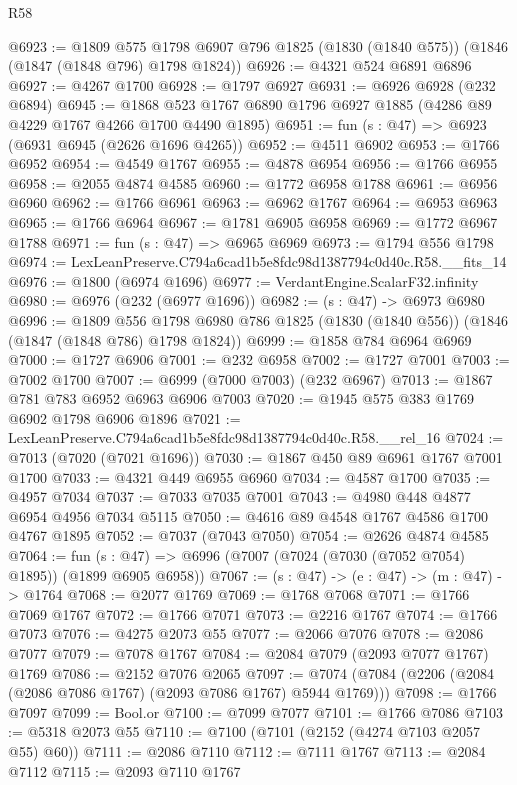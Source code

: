 \begin{lexlean}{R58}
\begin{coremodule}
@6923 := @1809
    @575
    @1798
    @6907
    @796
    @1825
    (@1830 (@1840 @575))
    (@1846 (@1847 (@1848 @796) @1798 @1824))
@6926 := @4321 @524 @6891 @6896
@6927 := @4267 @1700
@6928 := @1797 @6927
@6931 := @6926 @6928 (@232 @6894)
@6945 := @1868 @523 @1767 @6890 @1796 @6927 @1885 (@4286 @89 @4229 @1767 @4266 @1700 @4490 @1895)
@6951 := fun (s : @47) => @6923 (@6931 @6945 (@2626 @1696 @4265))
@6952 := @4511 @6902
@6953 := @1766 @6952
@6954 := @4549 @1767
@6955 := @4878 @6954
@6956 := @1766 @6955
@6958 := @2055 @4874 @4585
@6960 := @1772 @6958 @1788
@6961 := @6956 @6960
@6962 := @1766 @6961
@6963 := @6962 @1767
@6964 := @6953 @6963
@6965 := @1766 @6964
@6967 := @1781 @6905 @6958
@6969 := @1772 @6967 @1788
@6971 := fun (s : @47) => @6965 @6969
@6973 := @1794 @556 @1798
@6974 := LexLeanPreserve.C794a6cad1b5e8fdc98d1387794c0d40c.R58.__fits_14
@6976 := @1800 (@6974 @1696)
@6977 := VerdantEngine.ScalarF32.infinity
@6980 := @6976 (@232 (@6977 @1696))
@6982 := (s : @47) -> @6973 @6980
@6996 := @1809
    @556
    @1798
    @6980
    @786
    @1825
    (@1830 (@1840 @556))
    (@1846 (@1847 (@1848 @786) @1798 @1824))
@6999 := @1858 @784 @6964 @6969
@7000 := @1727 @6906
@7001 := @232 @6958
@7002 := @1727 @7001
@7003 := @7002 @1700
@7007 := @6999 (@7000 @7003) (@232 @6967)
@7013 := @1867 @781 @783 @6952 @6963 @6906 @7003
@7020 := @1945 @575 @383 @1769 @6902 @1798 @6906 @1896
@7021 := LexLeanPreserve.C794a6cad1b5e8fdc98d1387794c0d40c.R58.__rel_16
@7024 := @7013 (@7020 (@7021 @1696))
@7030 := @1867 @450 @89 @6961 @1767 @7001 @1700
@7033 := @4321 @449 @6955 @6960
@7034 := @4587 @1700
@7035 := @4957 @7034
@7037 := @7033 @7035 @7001
@7043 := @4980 @448 @4877 @6954 @4956 @7034 @5115
@7050 := @4616 @89 @4548 @1767 @4586 @1700 @4767 @1895
@7052 := @7037 (@7043 @7050)
@7054 := @2626 @4874 @4585
@7064 := fun (s : @47) => @6996 (@7007 (@7024 (@7030 (@7052 @7054) @1895)) (@1899 @6905 @6958))
@7067 := (s : @47) -> (e : @47) -> (m : @47) -> @1764
@7068 := @2077 @1769
@7069 := @1768 @7068
@7071 := @1766 @7069 @1767
@7072 := @1766 @7071
@7073 := @2216 @1767
@7074 := @1766 @7073
@7076 := @4275 @2073 @55
@7077 := @2066 @7076
@7078 := @2086 @7077
@7079 := @7078 @1767
@7084 := @2084 @7079 (@2093 @7077 @1767) @1769
@7086 := @2152 @7076 @2065
@7097 := @7074 (@7084 (@2206 (@2084 (@2086 @7086 @1767) (@2093 @7086 @1767) @5944 @1769)))
@7098 := @1766 @7097
@7099 := Bool.or
@7100 := @7099 @7077
@7101 := @1766 @7086
@7103 := @5318 @2073 @55
@7110 := @7100 (@7101 (@2152 (@4274 @7103 @2057 @55) @60))
@7111 := @2086 @7110
@7112 := @7111 @1767
@7113 := @2084 @7112
@7115 := @2093 @7110 @1767

\end{coremodule}
\end{lexlean}
